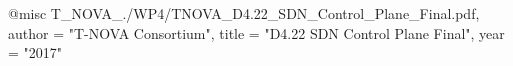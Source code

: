 @misc{ T_NOVA_./WP4/TNOVA_D4.22_SDN_Control_Plane_Final.pdf,
       author = "T-NOVA Consortium",
       title = "D4.22 SDN Control Plane Final",
       year = "2017" }
